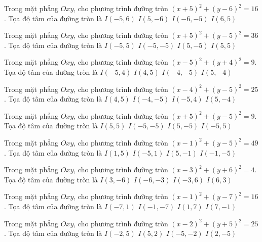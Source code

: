 \begin{ex}
Trong mặt phẳng $Oxy$, cho phương trình đường tròn $(x + 5)^2  + (y -6)^2 = 16$. Tọa độ tâm của đường tròn là
\choice
{ \True $I(-5, 6)$ }
{ $I(5, -6)$ }
{ $I(-6, -5)$ }
{ $I(6, 5)$ }
\end{ex}

\begin{ex}
Trong mặt phẳng $Oxy$, cho phương trình đường tròn $(x + 5)^2  + (y -5)^2 = 36$. Tọa độ tâm của đường tròn là
\choice
{ \True $I(-5, 5)$ }
{ $I(-5, -5)$ }
{ $I(5, -5)$ }
{ $I(5, 5)$ }
\end{ex}

\begin{ex}
Trong mặt phẳng $Oxy$, cho phương trình đường tròn $(x -5)^2   + (y + 4)^2 = 9$. Tọa độ tâm của đường tròn là
\choice
{ $I(-5, 4)$ }
{ $I(4, 5)$ }
{ $I(-4, -5)$ }
{ \True $I(5, -4)$ }
\end{ex}

\begin{ex}
Trong mặt phẳng $Oxy$, cho phương trình đường tròn $(x -4)^2   + (y -5)^2 = 25$. Tọa độ tâm của đường tròn là
\choice
{ \True $I(4, 5)$ }
{ $I(-4, -5)$ }
{ $I(-5, 4)$ }
{ $I(5, -4)$ }
\end{ex}

\begin{ex}
Trong mặt phẳng $Oxy$, cho phương trình đường tròn $(x + 5)^2  + (y -5)^2 = 9$. Tọa độ tâm của đường tròn là
\choice
{ $I(5, 5)$ }
{ $I(-5, -5)$ }
{ $I(5, -5)$ }
{ \True $I(-5, 5)$ }
\end{ex}

\begin{ex}
Trong mặt phẳng $Oxy$, cho phương trình đường tròn $(x -1)^2   + (y -5)^2 = 49$. Tọa độ tâm của đường tròn là
\choice
{ \True $I(1, 5)$ }
{ $I(-5, 1)$ }
{ $I(5, -1)$ }
{ $I(-1, -5)$ }
\end{ex}

\begin{ex}
Trong mặt phẳng $Oxy$, cho phương trình đường tròn $(x -3)^2   + (y + 6)^2 = 4$. Tọa độ tâm của đường tròn là
\choice
{ \True $I(3, -6)$ }
{ $I(-6, -3)$ }
{ $I(-3, 6)$ }
{ $I(6, 3)$ }
\end{ex}

\begin{ex}
Trong mặt phẳng $Oxy$, cho phương trình đường tròn $(x -1)^2   + (y -7)^2 = 16$. Tọa độ tâm của đường tròn là
\choice
{ $I(-7, 1)$ }
{ $I(-1, -7)$ }
{ \True $I(1, 7)$ }
{ $I(7, -1)$ }
\end{ex}

\begin{ex}
Trong mặt phẳng $Oxy$, cho phương trình đường tròn $(x -2)^2   + (y + 5)^2 = 25$. Tọa độ tâm của đường tròn là
\choice
{ $I(-2, 5)$ }
{ $I(5, 2)$ }
{ $I(-5, -2)$ }
{ \True $I(2, -5)$ }
\end{ex}

